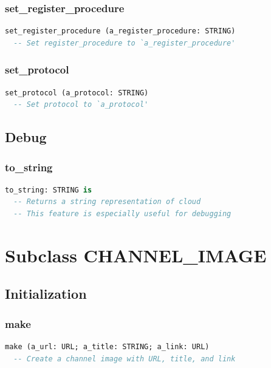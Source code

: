 \subsubsection{set\_register\_procedure}

\begin{lstlisting}[language=Eiffel]
set_register_procedure (a_register_procedure: STRING)
  -- Set register_procedure to `a_register_procedure'
\end{lstlisting}

\subsubsection{set\_protocol}

\begin{lstlisting}[language=Eiffel]
set_protocol (a_protocol: STRING)
  -- Set protocol to `a_protocol'
\end{lstlisting}

\subsection{Debug}
\label{sec:channel-cloud-debug}

\subsubsection{to\_string}

\begin{lstlisting}[language=Eiffel]
to_string: STRING is
  -- Returns a string representation of cloud
  -- This feature is especially useful for debugging
\end{lstlisting}


\section{Subclass CHANNEL\_IMAGE}
\label{sec:channel-image}

\subsection{Initialization}
\label{sec:channel-image-initialization}

\subsubsection{make}

\begin{lstlisting}[language=Eiffel]
make (a_url: URL; a_title: STRING; a_link: URL)
  -- Create a channel image with URL, title, and link
\end{lstlisting}


